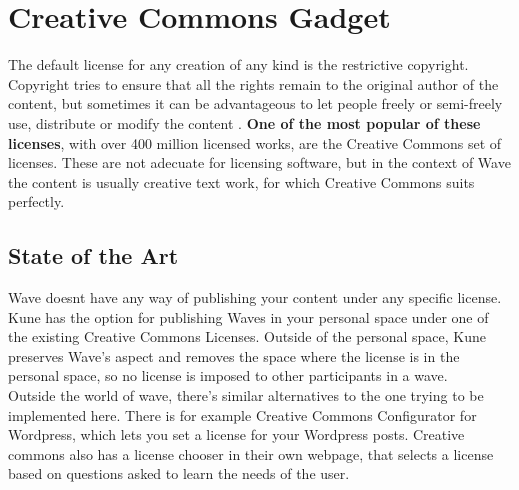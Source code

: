 \thispagestyle{sectioned}
\section{Creative Commons Gadget}

The default license for any creation of any kind is the restrictive copyright. Copyright tries to ensure that all the rights remain to the original author of the content, but sometimes it can be advantageous to let people freely or semi-freely use, distribute or modify the content \cite{ref:oss_why}. \textbf{One of the most popular of these licenses}, with over 400 million \cite{ref:the_power_of_open} licensed works, are the Creative Commons set of licenses. These are not adecuate for licensing software, but in the context of Wave the content is usually creative text work, for which Creative Commons suits perfectly.

\label{subsec:cc_soa}
\subsection{State of the Art}
Wave doesnt have any way of publishing your content under any specific license. Kune has the option for publishing Waves in your personal space under one of the existing Creative Commons Licenses. Outside of the personal space, Kune preserves Wave's aspect and removes the space where the license is in the personal space, so no license is imposed to other participants in a wave.\\[.2cm]
Outside the world of wave, there's similar alternatives to the one trying to be implemented here. There is for example Creative Commons Configurator for Wordpress, which lets you set a license for your Wordpress posts. Creative commons also has a license chooser \cite{ref:cc_chooser} in their own webpage, that selects a license based on questions asked to learn the needs of the user.
